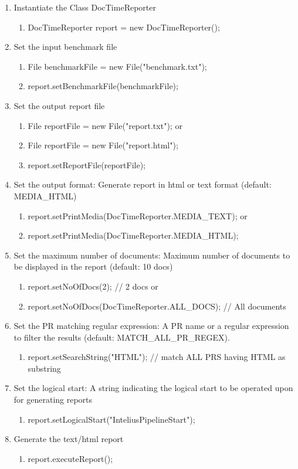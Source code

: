 \begin{enumerate}
  \item Instantiate the Class DocTimeReporter
  \begin{enumerate}
    \item DocTimeReporter report = new DocTimeReporter();
  \end{enumerate}
  \item Set the input benchmark file
  \begin{enumerate}
    \item File benchmarkFile = new File("benchmark.txt");
    \item report.setBenchmarkFile(benchmarkFile);
  \end{enumerate}
  \item Set the output report file
  \begin{enumerate}
    \item File reportFile = new File("report.txt");
    or
    \item File reportFile = new File("report.html");
    \item report.setReportFile(reportFile); 
  \end{enumerate}
  \item Set the output format: Generate report 
    in html or text format (default: MEDIA\_HTML)
  \begin{enumerate}
    \item report.setPrintMedia(DocTimeReporter.MEDIA\_TEXT); 
    or
    \item report.setPrintMedia(DocTimeReporter.MEDIA\_HTML); 
    \end{enumerate}
  \item Set the maximum number of documents: Maximum number of documents 
    to be displayed in the report (default: 10 docs)
  \begin{enumerate}
    \item report.setNoOfDocs(2); 
    // 2 docs or
    \item report.setNoOfDocs(DocTimeReporter.ALL\_DOCS); 
    // All documents
    \end{enumerate}
  \item Set the PR matching regular expression: A PR name or a regular
    expression to filter the results (default: MATCH\_ALL\_PR\_REGEX).
  \begin{enumerate}
    \item report.setSearchString("HTML"); 
    // match ALL PRS having HTML as substring
    \end{enumerate}
  \item Set the logical start: A string indicating 
    the logical start to be operated upon for generating reports
  \begin{enumerate}
    \item report.setLogicalStart("InteliusPipelineStart");
  \end{enumerate}
  \item Generate the text/html report
  \begin{enumerate}
    \item report.executeReport();
   \end{enumerate}
\end{enumerate}
